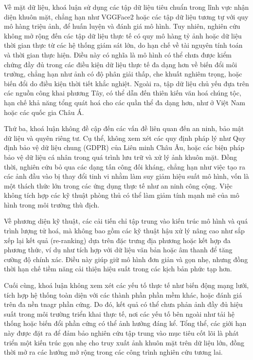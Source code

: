 Về mặt dữ liệu, khoá luận sử dụng các tập dữ liệu tiêu chuẩn trong lĩnh vực nhận diện khuôn mặt, chẳng hạn như VGGFace2 hoặc các tập dữ liệu tương tự với quy mô hàng triệu ảnh, để huấn luyện và đánh giá mô hình. Tuy nhiên, nghiên cứu không mở rộng đến các tập dữ liệu thực tế có quy mô hàng tỷ ảnh hoặc dữ liệu thời gian thực từ các hệ thống giám sát lớn, do hạn chế về tài nguyên tính toán và thời gian thực hiện. Điều này có nghĩa là mô hình có thể chưa được kiểm chứng đầy đủ trong các điều kiện dữ liệu thực tế đa dạng hơn về biến đổi môi trường, chẳng hạn như ảnh có độ phân giải thấp, che khuất nghiêm trọng, hoặc biến đổi do điều kiện thời tiết khắc nghiệt. Ngoài ra, tập dữ liệu chủ yếu đựa trên các nguồn công khai phương Tây, có thể dẫn đến thiên kiến văn hoá chúng tộc, hạn chế khả năng tổng quát hoá cho các quần thể đa dạng hơn, như ở Việt Nam hoặc các quốc gia Châu Á.

Thứ ba, khoá luận không đề cập đến các vấn đề liên quan đến an ninh, bảo mật dữ liệu và quyên riêng tư. Cụ thể, không xem xét các quy định pháp lý như Quy định bảo vệ dữ liệu chung (GDPR) của Liên minh Châu Âu, hoặc các biện pháp bảo vệ dữ liệu cá nhân trong quá trình lưu trữ và xử lý ảnh khuôn mặt. Đồng thời, nghiên cứu bỏ qua các dạng tấn công đối kháng, chẳng hạn như việc tạo ra các ảnh đầu vào bị thay đổi tinh vi nhằm làm suy giảm hiệu suất mô hình, vốn là một thách thức lớn trong các ứng dụng thực tế như an ninh công cộng. Việc không tích hợp các kỹ thuật phòng thủ có thể làm giảm tính mạnh mẽ của mô hình trong môi trường thù địch.

Về phương diện kỹ thuật, các cải tiến chỉ tập trung vào kiến trúc mô hình và quá trình lượng tử hoá, mà không bao gồm các kỹ thuật hậu xử lý nâng cao như sắp xếp lại kết quả (re-ranking) dựa trên đặc trưng địa phương hoặc kết hợp đa phương thức, ví dụ như tích hợp với dữ liệu văn bản hoặc âm thanh để tăng cường độ chính xác. Điều này giúp giữ mô hình đơn giản và gọn nhẹ, nhưng đồng thời hạn chế tiềm năng cải thiện hiệu suất trong các kịch bản phức tạp hơn.

Cuối cùng, khoá luận không xem xét các yếu tố thực tế như biến động mạng lưới, tích hợp hệ thống toàn diện với các thành phần phần mềm khác, hoặc đánh giá trên đa nền tnagr phần cứng. Do đó, kết quả có thể chưa phản ảnh đầy đủ hiệu suất trong môi trường triển khai thực tế, nơi các yếu tố bên ngoài như tải hệ thống hoặc biến đổi phần cứng có thể ảnh hưởng đáng kể. Tổng thể, các giới hạn này được đặt ra để đảm bảo nghiên cứu tập trung vào mục tiêu cốt lõi là phát triển một kiến trúc gọn nhẹ cho truy xuất ảnh khuôn mặt trên dữ liệu lớn, đồng thời mở ra các hướng mở rộng trong các công trình nghiên cứu tương lai.

